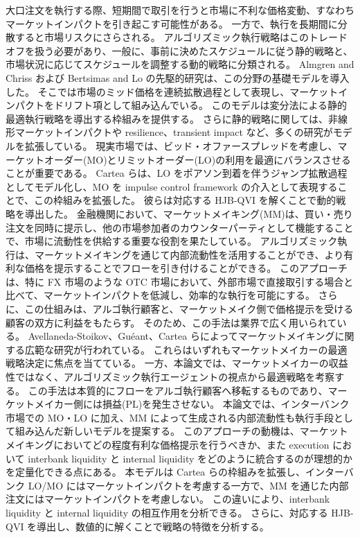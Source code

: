 大口注文を執行する際、短期間で取引を行うと市場に不利な価格変動、すなわちマーケットインパクトを引き起こす可能性がある。
一方で、執行を長期間に分散すると市場リスクにさらされる。
アルゴリズミック執行戦略はこのトレードオフを扱う必要があり、一般に、事前に決めたスケジュールに従う静的戦略と、市場状況に応じてスケジュールを調整する動的戦略に分類される。
Almgren and Chriss および Bertsimas and Lo の先駆的研究は、この分野の基礎モデルを導入した。
そこでは市場のミッド価格を連続拡散過程として表現し、マーケットインパクトをドリフト項として組み込んでいる。
このモデルは変分法による静的最適執行戦略を導出する枠組みを提供する。
さらに静的戦略に関しては、非線形マーケットインパクトや resilience、transient impact など、多くの研究がモデルを拡張している。
現実市場では、ビッド・オファースプレッドを考慮し、マーケットオーダー(MO)とリミットオーダー(LO)の利用を最適にバランスさせることが重要である。
Cartea らは、LO をポアソン到着を伴うジャンプ拡散過程としてモデル化し、MO を impulse control framework の介入として表現することで、この枠組みを拡張した。
彼らは対応する HJB-QVI を解くことで動的戦略を導出した。
金融機関において、マーケットメイキング(MM)は、買い・売り注文を同時に提示し、他の市場参加者のカウンターパーティとして機能することで、市場に流動性を供給する重要な役割を果たしている。
アルゴリズミック執行は、マーケットメイキングを通じて内部流動性を活用することができ、より有利な価格を提示することでフローを引き付けることができる。
このアプローチは、特に FX 市場のような OTC 市場において、外部市場で直接取引する場合と比べて、マーケットインパクトを低減し、効率的な執行を可能にする。
さらに、この仕組みは、アルゴ執行顧客と、マーケットメイク側で価格提示を受ける顧客の双方に利益をもたらす。
そのため、この手法は業界で広く用いられている。
Avellaneda-Stoikov、Guéant、Cartea らによってマーケットメイキングに関する広範な研究が行われている。
これらはいずれもマーケットメイカーの最適戦略決定に焦点を当てている。
一方、本論文では、マーケットメイカーの収益性ではなく、アルゴリズミック執行エージェントの視点から最適戦略を考察する。
この手法は本質的にフローをアルゴ執行顧客へ移転するものであり、マーケットメイカー側には損益(PL)を発生させない。
本論文では、インターバンク市場での MO・LO に加え、MM によって生成される内部流動性も執行手段として組み込んだ新しいモデルを提案する。
このアプローチの動機は、マーケットメイキングにおいてどの程度有利な価格提示を行うべきか、また execution において interbank liquidity と internal liquidity をどのように統合するのが理想的かを定量化できる点にある。
本モデルは Cartea らの枠組みを拡張し、インターバンク LO/MO にはマーケットインパクトを考慮する一方で、MM を通じた内部注文にはマーケットインパクトを考慮しない。
この違いにより、interbank liquidity と internal liquidity の相互作用を分析できる。
さらに、対応する HJB-QVI を導出し、数値的に解くことで戦略の特徴を分析する。
